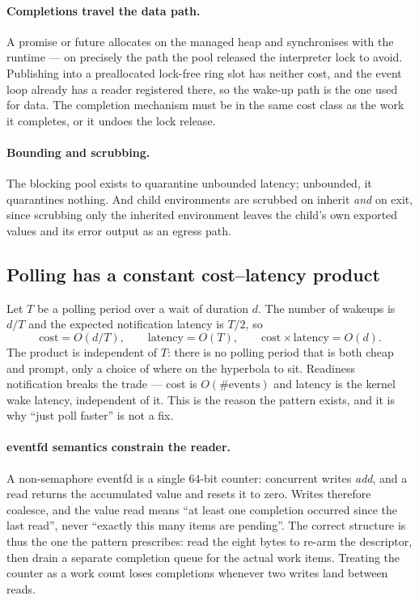 \documentclass[11pt]{article}
\begin{document}
\paragraph{Completions travel the data path.} A promise or future allocates on
the managed heap and synchronises with the runtime --- on precisely the path
the pool released the interpreter lock to avoid. Publishing into a preallocated
lock-free ring slot has neither cost, and the event loop already has a reader
registered there, so the wake-up path is the one used for data. The completion
mechanism must be in the same cost class as the work it completes, or it undoes
the lock release.

\paragraph{Bounding and scrubbing.} The blocking pool exists to quarantine
unbounded latency; unbounded, it quarantines nothing. And child environments
are scrubbed on inherit \emph{and} on exit, since scrubbing only the inherited
environment leaves the child's own exported values and its error output as an
egress path.

\subsection{Polling has a constant cost--latency product}
\label{lbl:HS-EXEC-02}

Let $T$ be a polling period over a wait of duration $d$. The number of wakeups
is $d/T$ and the expected notification latency is $T/2$, so
\begin{equation}
\mathrm{cost} = O(d/T), \qquad \mathrm{latency} = O(T), \qquad
\mathrm{cost} \times \mathrm{latency} = O(d) .
\end{equation}
The product is independent of $T$: there is no polling period that is both
cheap and prompt, only a choice of where on the hyperbola to sit. Readiness
notification breaks the trade --- cost is $O(\#\mathrm{events})$ and latency is
the kernel wake latency, independent of it. This is the reason the pattern
exists, and it is why ``just poll faster'' is not a fix.

\paragraph{eventfd semantics constrain the reader.} A non-semaphore eventfd is
a single 64-bit counter: concurrent writes \emph{add}, and a read returns the
accumulated value and resets it to zero. Writes therefore coalesce, and the
value read means ``at least one completion occurred since the last read'',
never ``exactly this many items are pending''. The correct structure is thus
the one the pattern prescribes: read the eight bytes to re-arm the descriptor,
then drain a separate completion queue for the actual work items. Treating the
counter as a work count loses completions whenever two writes land between
reads.
\end{document}
